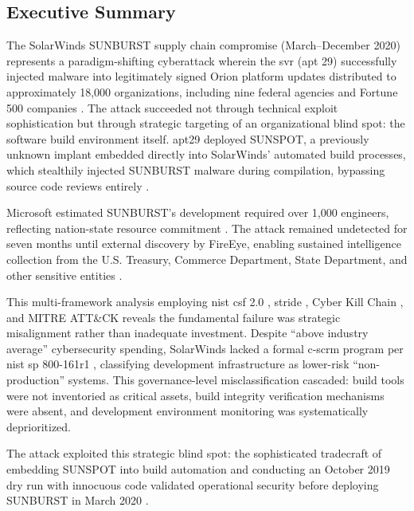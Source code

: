 \subsection*{Executive Summary}

The SolarWinds SUNBURST supply chain compromise (March--December 2020) represents a paradigm-shifting cyberattack wherein the \gls{svr} (\gls{apt} 29) successfully injected malware into legitimately signed Orion platform updates distributed to approximately 18,000 organizations, including nine federal agencies and Fortune 500 companies \cite{crowdstrike_sunspot_2021, mandiant_highly_2020, nagle_solarwinds_2023}. The attack succeeded not through technical exploit sophistication but through strategic targeting of an organizational blind spot: the software build environment itself. \gls{apt}29 deployed SUNSPOT, a previously unknown implant embedded directly into SolarWinds' automated build processes, which stealthily injected SUNBURST malware during compilation, bypassing source code reviews entirely \cite{crowdstrike_sunspot_2021, us_open_2021}.

Microsoft estimated SUNBURST's development required over 1,000 engineers, reflecting nation-state resource commitment \cite{ms_analyzing_2020, nagle_solarwinds_2023}. The attack remained undetected for seven months until external discovery by FireEye, enabling sustained intelligence collection from the U.S. Treasury, Commerce Department, State Department, and other sensitive entities \cite{us_open_2021}.

 This multi-framework analysis employing \gls{nist} \gls{csf} 2.0 \cite{pascoe_nist_2024}, \gls{stride} \cite{kohnfelder_threats_1999}, Cyber Kill Chain \cite{hutchins_intelligencedriven_2011}, and MITRE ATT\&CK \cite{strom_mitre_2018} reveals the fundamental failure was strategic misalignment rather than inadequate investment. Despite ``above industry average'' cybersecurity spending, SolarWinds lacked a formal \gls{c-scrm} program per \gls{nist} \gls{sp} 800-161r1 \cite{boyens_cybersecurity_2022}, classifying development infrastructure as lower-risk ``non-production'' systems. This governance-level misclassification cascaded: build tools were not inventoried as critical assets, build integrity verification mechanisms were absent, and development environment monitoring was systematically deprioritized.

The attack exploited this strategic blind spot: the sophisticated tradecraft of embedding SUNSPOT into build automation and conducting an October 2019 dry run with innocuous code validated operational security before deploying SUNBURST in March 2020 \cite{us_open_2021}.

